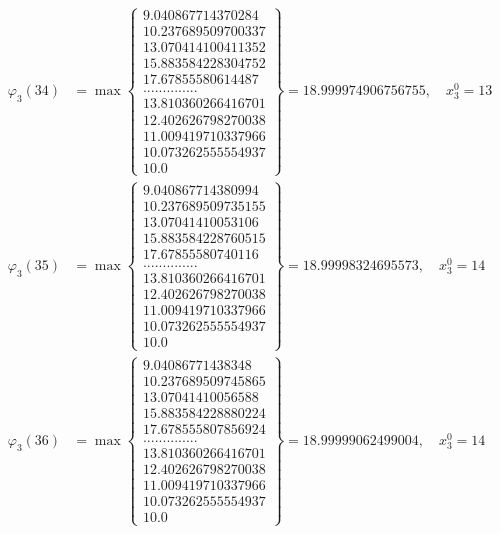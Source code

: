 \documentclass{article}
\begin{document}
\begin{align*}
  
  
  
\varphi_{3}(34) &= \max \left\{ \begin{array}{c}
9.040867714370284 \\
 10.237689509700337 \\
 13.070414100411352 \\
 15.883584228304752 \\
 17.67855580614487 \\
 .............. \\
 13.810360266416701 \\
 12.402626798270038 \\
 11.009419710337966 \\
 10.073262555554937 \\
 10.0
\end{array} \right\} = 18.999974906756755, \quad x_{3}^0 = 13\\
  
  
  
  
\varphi_{3}(35) &= \max \left\{ \begin{array}{c}
9.040867714380994 \\
 10.237689509735155 \\
 13.07041410053106 \\
 15.883584228760515 \\
 17.67855580740116 \\
 .............. \\
 13.810360266416701 \\
 12.402626798270038 \\
 11.009419710337966 \\
 10.073262555554937 \\
 10.0
\end{array} \right\} = 18.99998324695573, \quad x_{3}^0 = 14\\
  
  
  
  
\varphi_{3}(36) &= \max \left\{ \begin{array}{c}
9.04086771438348 \\
 10.237689509745865 \\
 13.07041410056588 \\
 15.883584228880224 \\
 17.678555807856924 \\
 .............. \\
 13.810360266416701 \\
 12.402626798270038 \\
 11.009419710337966 \\
 10.073262555554937 \\
 10.0
\end{array} \right\} = 18.99999062499004, \quad x_{3}^0 = 14\\
  
  
\end{align*}
\end{document}
